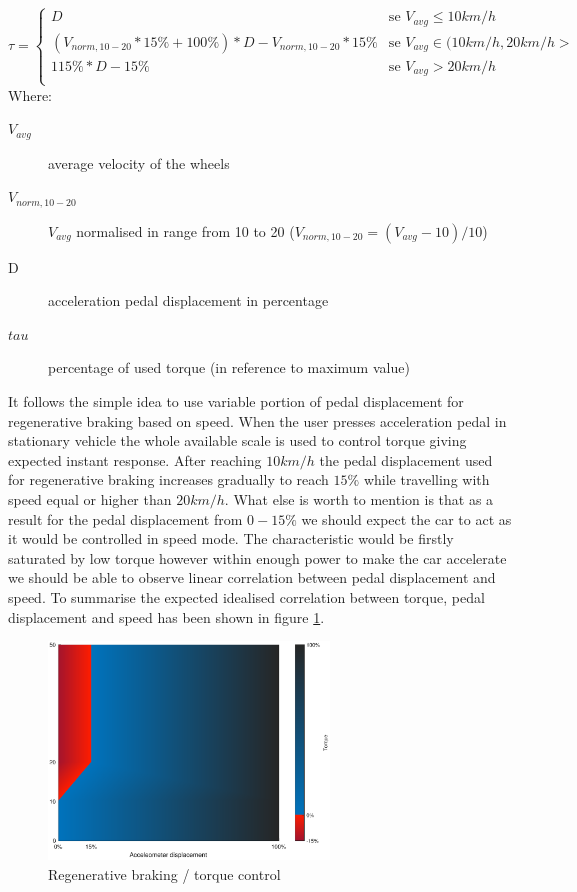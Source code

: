 \begin{equation*}
    \tau = \begin{cases}
        D & \text{se $V_{avg} \leq 10km/h$}\\
        (V_{norm,10-20} * 15\% + 100\%) * D - V_{norm,10-20} * 15\% & \text{se $V_{avg} \in (10km/h,20km/h>$}\\
        115\% * D - 15\% & \text{se $V_{avg} > 20km/h$}\\
    \end{cases}
    \label{reg_break_eq}
\end{equation*}
Where:
\begin{description}
    \item[$V_{avg}$] average velocity of the wheels 
    \item[$V_{norm,10-20}$] $V_{avg}$ normalised in range from 10 to 20 ($V_{norm,10-20}=(V_{avg}-10)/10$)
    \item[D] acceleration pedal displacement in percentage
    \item[$tau$] percentage of used torque (in reference to maximum value)
\end{description}

It follows the simple idea to use variable portion of pedal displacement for regenerative braking based on speed.
When the user presses acceleration pedal in stationary vehicle the whole available scale is used to control torque giving expected instant response. After reaching $10km/h$ the pedal  displacement used for regenerative braking increases gradually to reach $15\%$ while travelling with speed equal or higher than $20km/h$.
What else is worth to mention is that as a result for the pedal displacement from $0-15\%$ we should expect the car to act as it would be controlled in speed mode.\label{speed_mode} The characteristic would be firstly saturated by low torque however within enough power to make the car accelerate we should be able to observe linear correlation between pedal displacement and speed.
To summarise the expected idealised correlation between torque, pedal displacement and speed has been shown in figure \ref{regen_ideal}.

\begin{figure}[h]
    \centering
        \includegraphics[height=5.8cm]{figures/regen_ideal}
        \caption{Regenerative braking / torque control}
        \label{regen_ideal}
\end{figure}




